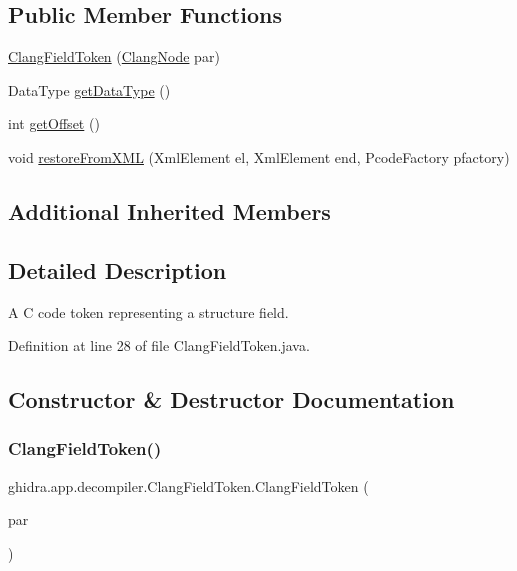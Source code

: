 \subsection*{Public Member Functions}
\begin{DoxyCompactItemize}
\item 
\mbox{\hyperlink{classghidra_1_1app_1_1decompiler_1_1_clang_field_token_ab6d5d6a6de2d2cf2e54f424e8ee25ea7}{Clang\+Field\+Token}} (\mbox{\hyperlink{interfaceghidra_1_1app_1_1decompiler_1_1_clang_node}{Clang\+Node}} par)
\item 
Data\+Type \mbox{\hyperlink{classghidra_1_1app_1_1decompiler_1_1_clang_field_token_a8335688bf1324caa45d8a5efa3863b48}{get\+Data\+Type}} ()
\item 
int \mbox{\hyperlink{classghidra_1_1app_1_1decompiler_1_1_clang_field_token_af08d90de7681b0d99d50b8801d4a3b6d}{get\+Offset}} ()
\item 
void \mbox{\hyperlink{classghidra_1_1app_1_1decompiler_1_1_clang_field_token_af479ed4013fc92d4529889d0c08d0ffc}{restore\+From\+X\+ML}} (Xml\+Element el, Xml\+Element end, Pcode\+Factory pfactory)
\end{DoxyCompactItemize}
\subsection*{Additional Inherited Members}


\subsection{Detailed Description}
A C code token representing a structure field. 

Definition at line 28 of file Clang\+Field\+Token.\+java.



\subsection{Constructor \& Destructor Documentation}
\mbox{\label{classghidra_1_1app_1_1decompiler_1_1_clang_field_token_ab6d5d6a6de2d2cf2e54f424e8ee25ea7}} 
\subsubsection{\texorpdfstring{ClangFieldToken()}{ClangFieldToken()}}
{\footnotesize\ttfamily ghidra.\+app.\+decompiler.\+Clang\+Field\+Token.\+Clang\+Field\+Token (\begin{DoxyParamCaption}\item[{\mbox{\hyperlink{interfaceghidra_1_1app_1_1decompiler_1_1_clang_node}{Clang\+Node}}}]{par }\end{DoxyParamCaption})\hspace{0.3cm}{\ttfamily [inline]}}



